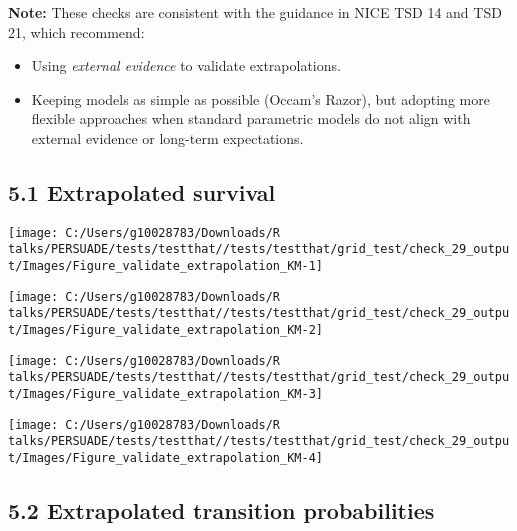 \documentclass[
]{article}
\providecommand{\tightlist}{%
  \setlength{\itemsep}{0pt}\setlength{\parskip}{0pt}}
\begin{document}
\textbf{Note:} These checks are consistent with the guidance in NICE TSD
14 and TSD 21, which recommend:

\begin{itemize}
\tightlist
\item
  Using \emph{external evidence} to validate extrapolations.\\
\item
  Keeping models as simple as possible (Occam's Razor), but adopting
  more flexible approaches when standard parametric models do not align
  with external evidence or long-term expectations.
\end{itemize}

\subsection{5.1 Extrapolated survival}\label{extrapolated-survival}

\begin{flushleft}\texttt{[image: C:/Users/g10028783/Downloads/R talks/PERSUADE/tests/testthat//tests/testthat/grid\_test/check\_29\_output/Images/Figure\_validate\_extrapolation\_KM-1]} \end{flushleft}

\begin{flushleft}\texttt{[image: C:/Users/g10028783/Downloads/R talks/PERSUADE/tests/testthat//tests/testthat/grid\_test/check\_29\_output/Images/Figure\_validate\_extrapolation\_KM-2]} \end{flushleft}

\begin{flushleft}\texttt{[image: C:/Users/g10028783/Downloads/R talks/PERSUADE/tests/testthat//tests/testthat/grid\_test/check\_29\_output/Images/Figure\_validate\_extrapolation\_KM-3]} \end{flushleft}

\begin{flushleft}\texttt{[image: C:/Users/g10028783/Downloads/R talks/PERSUADE/tests/testthat//tests/testthat/grid\_test/check\_29\_output/Images/Figure\_validate\_extrapolation\_KM-4]} \end{flushleft}

\clearpage

\subsection{5.2 Extrapolated transition
probabilities}\label{extrapolated-transition-probabilities}
\end{document}
